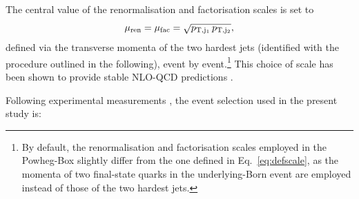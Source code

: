 \documentclass[twocolumn,epjc3]{svjour3} %
\begin{document}
    The central value of the renormalisation and factorisation scales is set to 
    \begin{equation}
    \label{eq:defscale}
     \mu_{\rm ren} = \mu_{\rm fac} = \sqrt{p_{\rm T, j_1}\, p_{\rm T, j_2}}, 
    \end{equation}
    defined via the transverse momenta of the two hardest jets (identified with the procedure outlined in the following), 
    event by event.\footnote{By default, the renormalisation and factorisation scales employed in the {\sc Powheg-Box} slightly differ from the 
        one defined in Eq.~\eqref{eq:defscale}, as the momenta of two final-state quarks in the underlying-Born event are
        employed instead of those of the two hardest jets.\label{foot:powheg}} 
    This choice of scale has been shown to provide stable NLO-QCD predictions \cite{Denner:2012dz}.

    Following experimental measurements \cite{Aad:2014zda,Aaboud:2016ffv,Khachatryan:2014sta,CMS:2017adb}, the event selection used in the present study is:
\end{document}
